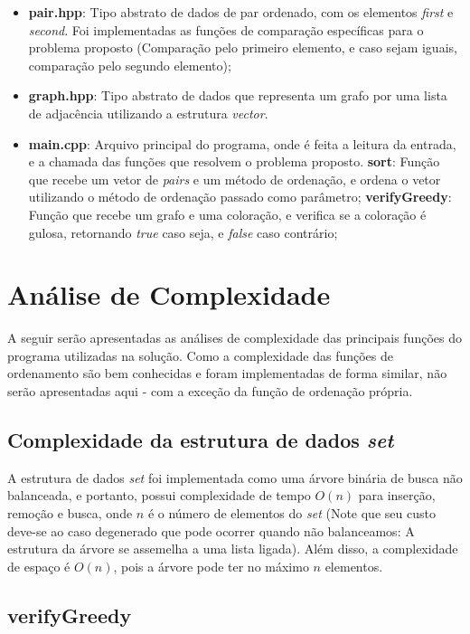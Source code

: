 \documentclass{article}
\begin{document}
\begin{itemize}
    \item \textbf{pair.hpp}: Tipo abstrato de dados de par ordenado, com os elementos \emph{first} e \emph{second}. Foi implementadas as funções de comparação específicas para o problema proposto (Comparação pelo primeiro elemento, e caso sejam iguais, comparação pelo segundo elemento);
    \item \textbf{graph.hpp}: Tipo abstrato de dados que representa um grafo por uma lista de adjacência utilizando a estrutura \emph{vector}. 
    \item \textbf{main.cpp}: Arquivo principal do programa, onde é feita a leitura da entrada, e a chamada das funções que resolvem o problema proposto.
        \subitem \textbf{sort}: Função que recebe um vetor de \emph{pairs} e um método de ordenação, e ordena o vetor utilizando o método de ordenação passado como parâmetro;
        \subitem \textbf{verifyGreedy}: Função que recebe um grafo e uma coloração, e verifica se a coloração é gulosa, retornando \emph{true} caso seja, e \emph{false} caso contrário;
    
\end{itemize}

\section{Análise de Complexidade}

A seguir serão apresentadas as análises de complexidade das principais funções do programa utilizadas na solução. Como a complexidade das funções de ordenamento são bem conhecidas e foram implementadas de forma similar, não serão apresentadas aqui - com a exceção da função de ordenação própria.

\subsection{Complexidade da estrutura de dados \emph{set}}

A estrutura de dados \emph{set} foi implementada como uma árvore binária de busca não balanceada, e portanto, possui complexidade de tempo $ O(n)$ para inserção, remoção e busca, onde $n$ é o número de elementos do \emph{set} (Note que seu custo deve-se ao caso degenerado que pode ocorrer quando não balanceamos: A estrutura da árvore se assemelha a uma lista ligada). Além disso, a complexidade de espaço é $O(n)$, pois a árvore pode ter no máximo $n$ elementos.

\subsection{verifyGreedy}
\end{document}
